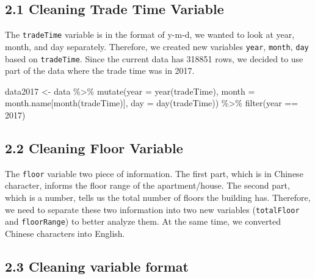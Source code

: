 \documentclass[
]{article}
\newenvironment{Shaded}{\begin{snugshade}}{\end{snugshade}}
\newcommand{\AttributeTok}[1]{\textcolor[rgb]{0.77,0.63,0.00}{#1}}
\newcommand{\DecValTok}[1]{\textcolor[rgb]{0.00,0.00,0.81}{#1}}
\newcommand{\FunctionTok}[1]{\textcolor[rgb]{0.00,0.00,0.00}{#1}}
\newcommand{\NormalTok}[1]{#1}
\newcommand{\OtherTok}[1]{\textcolor[rgb]{0.56,0.35,0.01}{#1}}
\newcommand{\SpecialCharTok}[1]{\textcolor[rgb]{0.00,0.00,0.00}{#1}}
\begin{document}
\hypertarget{cleaning-trade-time-variable}{%
\subsection{2.1 Cleaning Trade Time
Variable}\label{cleaning-trade-time-variable}}

The \texttt{tradeTime} variable is in the format of y-m-d, we wanted to
look at year, month, and day separately. Therefore, we created new
variables \texttt{year}, \texttt{month}, \texttt{day} based on
\texttt{tradeTime}. \newline Since the current data has 318851 rows, we
decided to use part of the data where the trade time was in 2017.

\begin{Shaded}
\begin{Highlighting}[]
\NormalTok{data2017 }\OtherTok{\textless{}{-}}\NormalTok{ data }\SpecialCharTok{\%\textgreater{}\%} 
  \FunctionTok{mutate}\NormalTok{(}\AttributeTok{year =} \FunctionTok{year}\NormalTok{(tradeTime), }\AttributeTok{month =}\NormalTok{ month.name[}\FunctionTok{month}\NormalTok{(tradeTime)], }\AttributeTok{day =} \FunctionTok{day}\NormalTok{(tradeTime)) }\SpecialCharTok{\%\textgreater{}\%}
  \FunctionTok{filter}\NormalTok{(year }\SpecialCharTok{==} \DecValTok{2017}\NormalTok{)}
\end{Highlighting}
\end{Shaded}

\hypertarget{cleaning-floor-variable}{%
\subsection{2.2 Cleaning Floor Variable}\label{cleaning-floor-variable}}

The \texttt{floor} variable two piece of information. The first part,
which is in Chinese character, informs the floor range of the
apartment/house. The second part, which is a number, tells us the total
number of floors the building has. Therefore, we need to separate these
two information into two new variables (\texttt{totalFloor} and
\texttt{floorRange}) to better analyze them. At the same time, we
converted Chinese characters into English.

\hypertarget{cleaning-variable-format}{%
\subsection{2.3 Cleaning variable
format}\label{cleaning-variable-format}}
\end{document}

